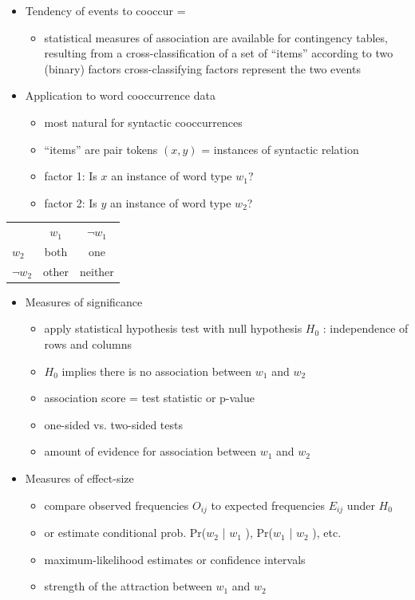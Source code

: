 \documentclass[a4paper,landscape,headrule,footrule,xetex]{foils}
\begin{document}
\begin{itemize}
\item Tendency of events to cooccur = 
\begin{itemize}
\item statistical measures of association are available for
contingency tables, resulting from a cross-classification
of a set of “items” according to two (binary) factors
cross-classifying factors represent the two events
\end{itemize}
\item Application to word cooccurrence data
\begin{itemize}

\item most natural for syntactic cooccurrences
\item ``items'' are pair tokens $(x, y)$ = instances of syntactic relation
\item factor 1: Is $x$ an instance of word type $w_1$?
\item factor 2: Is $y$ an instance of word type $w_2$?
\end{itemize}
\end{itemize}



\begin{tabular}{lcc}
     & $w_1$ & $\neg w_1$ \\
   $w_2$ & both & one \\ 
$\neg w_2$ & other & neither 
\end{tabular}


\begin{itemize}
\item Measures of significance
\begin{itemize}
\item
apply statistical hypothesis test with null hypothesis $H_0$ :
independence of rows and columns
\item $H_0$ implies there is no association between $w_1$ and $w_2$
\item association score = test statistic or p-value
\item one-sided vs. two-sided tests
\item[\into] amount of evidence for association between $w_1$ and $w_2$
\end{itemize}
\newpage
\item Measures of effect-size
\begin{itemize}
\item compare observed frequencies $O_{ij}$ to expected
frequencies $E_{ij}$ under $H_0$
\item  or estimate conditional prob. Pr($w_2$ | $w_1$ ), Pr($w_1$ | $w_2$ ), etc.
\item maximum-likelihood estimates or confidence intervals
\item[\into] strength of the attraction between $w_1$ and $w_2$
\end{itemize}
\end{itemize}
\end{document}
